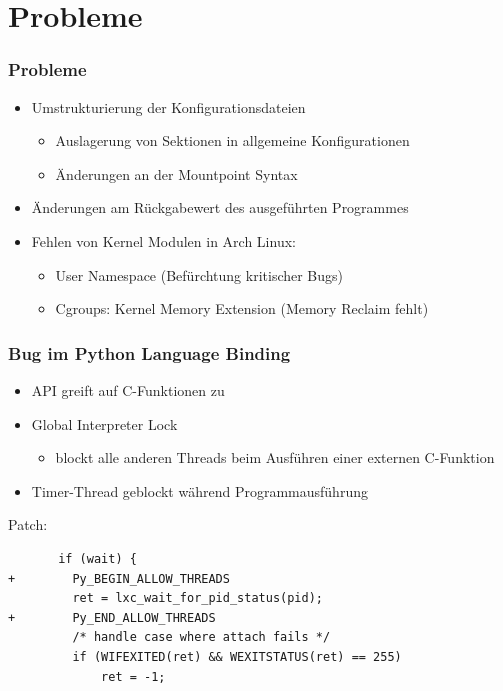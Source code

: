 \section{Probleme}

\begin{frame}
 \frametitle{Probleme}
 \begin{itemize}
  \item Umstrukturierung der Konfigurationsdateien
  \begin{itemize}
   \item Auslagerung von Sektionen in allgemeine Konfigurationen
   \item Änderungen an der Mountpoint Syntax
  \end{itemize}
  \item Änderungen am Rückgabewert des ausgeführten Programmes
  \item Fehlen von Kernel Modulen in Arch Linux:
  \begin{itemize}
   \item User Namespace (Befürchtung kritischer Bugs)
   \item Cgroups: Kernel Memory Extension (Memory Reclaim fehlt)
  \end{itemize}
 \end{itemize}
\end{frame}

\begin{frame}[fragile]
 \frametitle{Bug im Python Language Binding}
 \begin{itemize}
  \item API greift auf C-Funktionen zu
  \item Global Interpreter Lock
  \begin{itemize}
   \item blockt alle anderen Threads beim Ausführen einer externen C-Funktion
  \end{itemize}
  \item Timer-Thread geblockt während Programmausführung
 \end{itemize}
 Patch:
 \begin{verbatim}
       if (wait) {
+        Py_BEGIN_ALLOW_THREADS
         ret = lxc_wait_for_pid_status(pid);
+        Py_END_ALLOW_THREADS
         /* handle case where attach fails */
         if (WIFEXITED(ret) && WEXITSTATUS(ret) == 255)
             ret = -1;
 \end{verbatim}
\end{frame}

